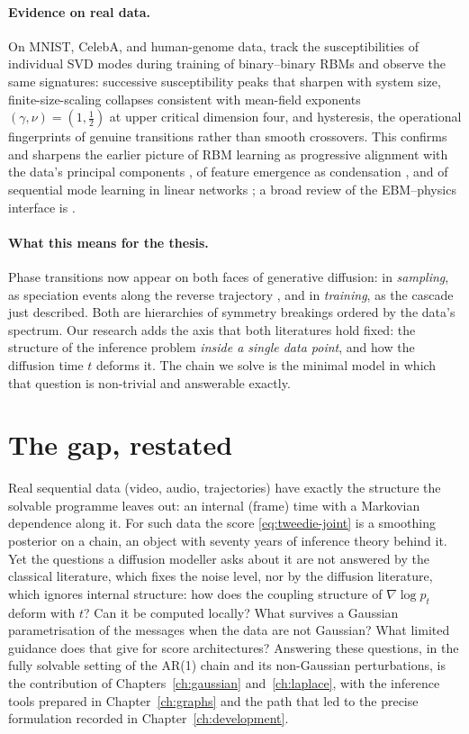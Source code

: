 \paragraph{Evidence on real data.} On MNIST, CelebA, and human-genome
data, \citet{bachtis2024cascade} track the susceptibilities of individual
SVD modes during training of binary--binary RBMs and observe the same
signatures: successive susceptibility peaks that sharpen with system
size, finite-size-scaling collapses consistent with mean-field exponents
$(\gamma, \nu) = (1, \tfrac12)$ at upper critical dimension four, and
hysteresis, the operational fingerprints of genuine transitions rather
than smooth crossovers. This confirms and sharpens the earlier picture of
RBM learning as progressive alignment with the data's principal
components \citep{decelle2017spectral}, of feature emergence as
condensation \citep{tubiana2017emergence}, and of sequential mode
learning in linear networks \citep{saxe2014exact}; a broad review of the
EBM--physics interface is \citet{carbone2025hitchhiker}.

\paragraph{What this means for the thesis.} Phase transitions now appear
on both faces of generative diffusion: in \emph{sampling}, as speciation
events along the reverse trajectory \citep{biroli2024dynamical,
achilli2026speciation}, and in \emph{training}, as the cascade just
described. Both are hierarchies of symmetry breakings ordered by the
data's spectrum. Our research adds the axis that both literatures hold
fixed: the structure of the inference problem \emph{inside a single data
point}, and how the diffusion time $t$ deforms it. The chain we solve is
the minimal model in which that question is non-trivial and answerable
exactly.

\section{The gap, restated}\label{sec:gap}\label{sec:related}

Real sequential data (video, audio, trajectories) have exactly the
structure the solvable programme leaves out: an internal (frame) time
with a Markovian dependence along it. For such data the score
\eqref{eq:tweedie-joint} is a smoothing posterior on a chain, an object
with seventy years of inference theory behind it. Yet the questions a
diffusion modeller asks about it are not answered by the classical
literature, which fixes the noise level, nor by the diffusion literature,
which ignores internal structure: how does the coupling structure of
$\nabla \log p_t$ deform with $t$? Can it be computed locally? What
survives a Gaussian parametrisation of the messages when the data are not
Gaussian? What limited guidance does that give for score architectures?
Answering these questions, in the fully solvable setting of the AR(1)
chain and its non-Gaussian perturbations, is the contribution of
Chapters~\ref{ch:gaussian} and~\ref{ch:laplace}, with the inference tools
prepared in Chapter~\ref{ch:graphs} and the path that led to the precise
formulation recorded in Chapter~\ref{ch:development}.
